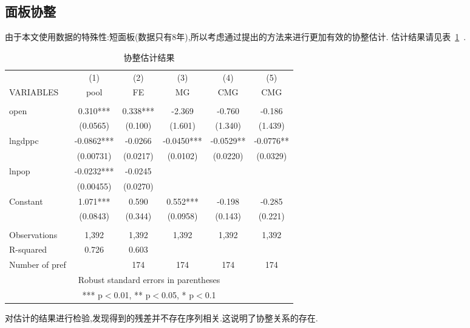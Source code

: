 \documentclass[10pt]{article}
\begin{document}
\subsection{面板协整}
    由于本文使用数据的特殊性:短面板(数据只有8年),所以考虑通过\cite{pesaran2006estimation}提出的方法来进行更加有效的协整估计. 估计结果请见表~\ref{tb:coint}~.
    \begin{table}[ht]
        \begin{center}
        \caption{协整估计结果} \label{tb:coint}
            \begin{tabular}{lccccc} \hline \hline
             & (1) & (2) & (3) & (4) & (5) \\
            VARIABLES & pool & FE & MG & CMG & CMG \\ \hline
             &  &  &  &  &  \\
            open & 0.310*** & 0.338*** & -2.369 & -0.760 & -0.186 \\
             & (0.0565) & (0.100) & (1.601) & (1.340) & (1.439) \\
            lngdppc & -0.0862*** & -0.0266 & -0.0450*** & -0.0529** & -0.0776** \\
             & (0.00731) & (0.0217) & (0.0102) & (0.0220) & (0.0329) \\
            lnpop & -0.0232*** & -0.0245 &  &  &  \\
             & (0.00455) & (0.0270) &  &  &  \\
            Constant & 1.071*** & 0.590 & 0.552*** & -0.198 & -0.285 \\
             & (0.0843) & (0.344) & (0.0958) & (0.143) & (0.221) \\
             &  &  &  &  &  \\
            Observations & 1,392 & 1,392 & 1,392 & 1,392 & 1,392 \\
            R-squared & 0.726 & 0.603 &  &  &  \\
             Number of pref &  & 174 & 174 & 174 & 174 \\ \hline \hline
            \multicolumn{6}{c}{ Robust standard errors in parentheses} \\
            \multicolumn{6}{c}{ *** p$<$0.01, ** p$<$0.05, * p$<$0.1} \\
        \end{tabular}
        \end{center}
    \end{table}
    对估计的结果进行检验,发现得到的残差并不存在序列相关.这说明了协整关系的存在.
\end{document}
